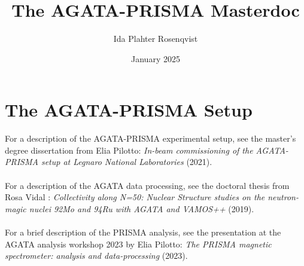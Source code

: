 \documentclass{article}
\title{The AGATA-PRISMA Masterdoc}
\author{Ida Plahter Rosenqvist}
\date{January 2025}
\begin{document}
\maketitle

\tableofcontents

\pagebreak

\section{The AGATA-PRISMA Setup}
For a description of the AGATA-PRISMA experimental setup, see the master's degree dissertation from Elia Pilotto: \emph{In-beam commissioning of the AGATA-PRISMA setup at Legnaro National Laboratories} (2021).\\\\
For a description of the AGATA data processing, see the doctoral thesis from Rosa Vidal : \emph{Collectivity along N=50: Nuclear Structure studies on the neutron-magic nuclei 92Mo and 94Ru with AGATA and VAMOS++} (2019). \\\\
For a brief description of the PRISMA analysis, see the presentation at the AGATA analysis workshop 2023 by Elia Pilotto: \emph{The PRISMA magnetic spectrometer: analysis and data-processing} (2023).\\\\
\end{document}
